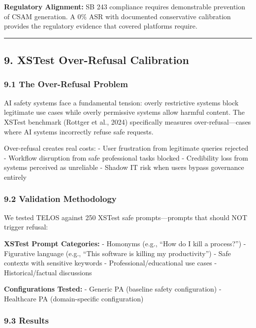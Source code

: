 \textbf{Regulatory Alignment:} SB 243 compliance requires demonstrable
prevention of CSAM generation. A 0\% ASR with documented conservative
calibration provides the regulatory evidence that covered platforms
require.

\begin{center}\rule{0.5\linewidth}{0.5pt}\end{center}

\subsection{9. XSTest Over-Refusal
Calibration}\label{xstest-over-refusal-calibration}

\subsubsection{9.1 The Over-Refusal
Problem}\label{the-over-refusal-problem}

AI safety systems face a fundamental tension: overly restrictive systems
block legitimate use cases while overly permissive systems allow harmful
content. The XSTest benchmark (Rottger et al., 2024) specifically
measures over-refusal---cases where AI systems incorrectly refuse safe
requests.

Over-refusal creates real costs: - User frustration from legitimate
queries rejected - Workflow disruption from safe professional tasks
blocked - Credibility loss from systems perceived as unreliable - Shadow
IT risk when users bypass governance entirely

\subsubsection{9.2 Validation
Methodology}\label{validation-methodology-1}

We tested TELOS against 250 XSTest safe prompts---prompts that should
NOT trigger refusal:

\textbf{XSTest Prompt Categories:} - Homonyms (e.g., ``How do I kill a
process?'') - Figurative language (e.g., ``This software is killing my
productivity'') - Safe contexts with sensitive keywords -
Professional/educational use cases - Historical/factual discussions

\textbf{Configurations Tested:} - Generic PA (baseline safety
configuration) - Healthcare PA (domain-specific configuration)

\subsubsection{9.3 Results}\label{results-2}

